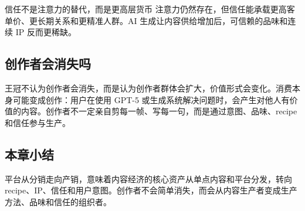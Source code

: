 \begin{warningbox}{信任不是注意力的替代，而是更高层货币}
注意力仍然存在，但信任能承载更高客单价、更长期关系和更精准人群。AI 生成让内容供给增加后，可信赖的品味和连续 IP 反而更稀缺。
\end{warningbox}

\subsection{创作者会消失吗}

王冠不认为创作者会消失，而是认为创作者群体会扩大，价值形式会变化。消费本身可能变成创作：用户在使用 GPT-5 或生成系统解决问题时，会产生对他人有价值的内容。创作者不一定亲自剪每一帧、写每一句，而是通过意图、品味、recipe 和信任参与生产。

\subsection{本章小结}

平台从分销走向产销，意味着内容经济的核心资产从单点内容和平台分发，转向 recipe、IP、信任和用户意图。创作者不会简单消失，而会从内容生产者变成生产方法、品味和信任的组织者。

